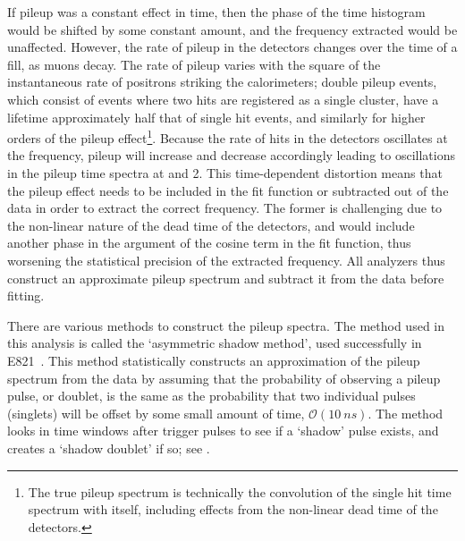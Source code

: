 If pileup was a constant effect in time, then the phase of the time histogram would be shifted by some constant amount, and the \wa frequency extracted would be unaffected. However, the rate of pileup in the detectors changes over the time of a fill, as muons decay. The rate of pileup varies with the square of the instantaneous rate of positrons striking the calorimeters; double pileup events, which consist of events where two hits are registered as a single cluster, have a lifetime approximately half that of single hit events, and similarly for higher orders of the pileup effect\footnote{The true pileup spectrum is technically the convolution of the single hit time spectrum with itself, including effects from the non-linear dead time of the detectors.}. Because the rate of hits in the detectors oscillates at the \gmtwo frequency, pileup will increase and decrease accordingly leading to oscillations in the pileup time spectra at \wa and 2\wa. This time-dependent distortion means that the pileup effect needs to be included in the fit function or subtracted out of the data in order to extract the correct \wa frequency. The former is challenging due to the non-linear nature of the dead time of the detectors, and would include another phase in the argument of the cosine term in the fit function, thus worsening the statistical precision of the extracted \wa frequency. All analyzers thus construct an approximate pileup spectrum and subtract it from the data before fitting.






There are various methods to construct the pileup spectra. The method used in this analysis is called the `asymmetric shadow method', used successfully in E821~\cite{E821PileupShadow}. This method statistically constructs an approximation of the pileup spectrum from the data by assuming that the probability of observing a pileup pulse, or doublet, is the same as the probability that two individual pulses (singlets) will be offset by some small amount of time, $\mathcal{O}(\SI{10}{ns})$. The method looks in time windows after trigger pulses to see if a `shadow' pulse exists, and creates a `shadow doublet' if so; see .

